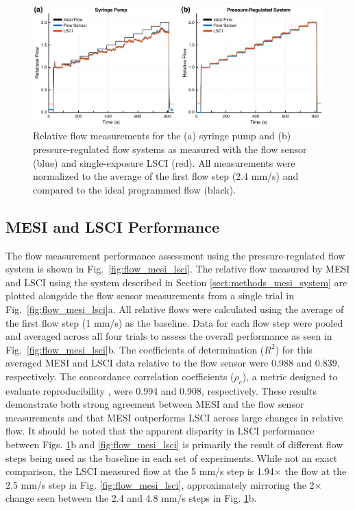 \documentclass[12pt]{spieman}
\begin{document}
\begin{spacing}{2}
\begin{figure}
    \includegraphics[width=\textwidth]{Figure5.pdf}
    \caption {
        Relative flow measurements for the (a) syringe pump and (b) pressure-regulated flow systems as measured with the flow sensor (blue) and single-exposure LSCI (red). All measurements were normalized to the average of the first flow step (2.4 mm/s) and compared to the ideal programmed flow (black).
    }
    \label{fig:SvP-FS_LSCI}
\end{figure}


\subsection{MESI and LSCI Performance}
\label{sect:results_mesi_lsci_measure}

The flow measurement performance assessment using the pressure-regulated flow system is shown in Fig.~\ref{fig:flow_mesi_lsci}. The relative flow measured by MESI and LSCI using the system described in Section \ref{sect:methods_mesi_system} are plotted alongside the flow sensor measurements from a single trial in Fig.~\ref{fig:flow_mesi_lsci}a. All relative flows were calculated using the average of the first flow step (1 mm/s) as the baseline. Data for each flow step were pooled and averaged across all four trials to assess the overall performance as seen in Fig.~\ref{fig:flow_mesi_lsci}b. The coefficients of determination ($R^2$) for this averaged MESI and LSCI data relative to the flow sensor were 0.988 and 0.839, respectively. The concordance correlation coefficients ($\rho_c$), a metric designed to evaluate reproducibility \cite{Lin.1989}, were 0.994 and 0.908, respectively. These results demonstrate both strong agreement between MESI and the flow sensor measurements and that MESI outperforms LSCI across large changes in relative flow. It should be noted that the apparent disparity in LSCI performance between Figs. \ref{fig:SvP-FS_LSCI}b and \ref{fig:flow_mesi_lsci} is primarily the result of different flow steps being used as the baseline in each set of experiments. While not an exact comparison, the LSCI measured flow at the 5 mm/s step is 1.94$\times$ the flow at the 2.5 mm/s step in Fig. \ref{fig:flow_mesi_lsci}, approximately mirroring the 2$\times$ change seen between the 2.4 and 4.8 mm/s steps in Fig. \ref{fig:SvP-FS_LSCI}b.


\end{spacing}
\end{document}
